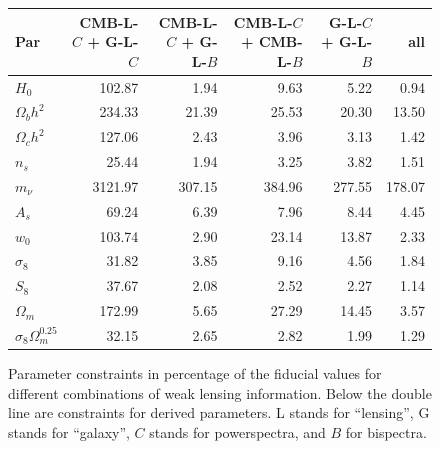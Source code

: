 \documentclass[11pt]{article} %
\begin{document}
\begin{figure}
    \centering
    \tiny
    \begin{tabular}{lrrrrr}
        \hline
         Par                       &   CMB-L-$C$ + G-L-$C$ &   CMB-L-$C$ + G-L-$B$ &   CMB-L-$C$ + CMB-L-$B$ &   G-L-$C$ + G-L-$B$ &   all \\
        \hline
         $H_0$                     &              102.87 &             1.94 &                9.63 &                5.22 &                      0.94 \\
         $\Omega_b h^2$            &              234.33 &            21.39 &               25.53 &               20.30 &                     13.50 \\
         $\Omega_c h^2$            &              127.06 &             2.43 &                3.96 &                3.13 &                      1.42 \\
         $n_s$                     &               25.44 &             1.94 &                3.25 &                3.82 &                      1.51 \\
         $m_\nu$                   &             3121.97 &           307.15 &              384.96 &              277.55 &                    178.07 \\
         $A_s$                     &               69.24 &             6.39 &                7.96 &                8.44 &                      4.45 \\
         $w_0$                     &              103.74 &             2.90 &               23.14 &               13.87 &                      2.33 \\
         \hline
         \hline
         $\sigma_8$                &               31.82 &             3.85 &                9.16 &                4.56 &                      1.84 \\
         $S_8$                     &               37.67 &             2.08 &                2.52 &                2.27 &                      1.14 \\
         $\Omega_m$                &              172.99 &             5.65 &               27.29 &               14.45 &                      3.57 \\
         $\sigma_8\Omega_m^{0.25}$ &               32.15 &             2.65 &                2.82 &                1.99 &                      1.29 \\
        \hline
        \end{tabular}
\caption{Parameter constraints in percentage of the fiducial values for different combinations of weak lensing information. Below the double line are constraints for derived parameters. L stands for ``lensing'', G stands for ``galaxy'', $C$ stands for powerspectra, and $B$ for bispectra.}
\label{tab:paramconstraintsall}
\end{figure}
\end{document}
